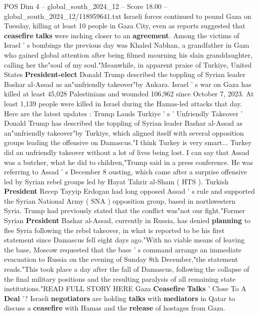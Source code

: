 \begin{textsample}{POS Dim 4 – global\_south\_2024\_12 – Score 18.00 – global\_south\_2024\_12/118959641.txt}  \label{ex:f4_pos_238}
Israeli forces continued to pound Gaza on Tuesday, killing at least 10 people in Gaza City, even as reports suggested that \textbf{ceasefire} \textbf{talks} were inching closer to an \textbf{agreement}.
Among the victims of Israel ' s bombings the previous day was Khaled Nabhan, a grandfather in Gaza who gained global attention after being filmed mourning his slain granddaughter, calling her the"soul of my soul."Meanwhile, in apparent praise of Turkiye, United States \textbf{President-elect} Donald Trump described the toppling of Syrian leader Bashar al-Assad as an"unfriendly takeover"by Ankara.
Israel ' s war on Gaza has killed at least 45,028 Palestinians and wounded 106,962 since October 7, 2023.
At least 1,139 people were killed in Israel during the Hamas-led attacks that day.
Here are the latest updates : Trump Lauds Turkiye ' s ' Unfriendly Takeover ' Donald Trump has described the toppling of Syrian leader Bashar al-Assad as an"unfriendly takeover"by Turkiye, which aligned itself with several opposition groups leading the offensive on Damascus."I think Turkey is very smart...
Turkey did an unfriendly takeover without a lot of lives being lost.
I can say that Assad was a butcher, what he did to children,"Trump said in a press conference.
He was referring to Assad ' s December 8 ousting, which came after a surprise offensive led by Syrian rebel groups led by Hayat Tahrir al-Sham ( HTS ).
Turkish \textbf{President} Recep Tayyip Erdogan had long opposed Assad ' s rule and supported the Syrian National Army ( SNA ) opposition group, based in northwestern Syria.
Trump had previously stated that the conflict was"not our fight."Former Syrian \textbf{President} Bashar al-Assad, currently in Russia, has denied \textbf{planning} to flee Syria following the rebel takeover, in what is reported to be his first statement since Damascus fell eight days ago."With no viable means of leaving the base, Moscow requested that the base ' s command arrange an immediate evacuation to Russia on the evening of Sunday 8th December,"the statement reads."This took place a day after the fall of Damascus, following the collapse of the final military positions and the resulting paralysis of all remaining state institutions."READ FULL STORY HERE Gaza \textbf{Ceasefire} \textbf{Talks} ' Close To A \textbf{Deal} '?
Israeli \textbf{negotiators} are holding \textbf{talks} with \textbf{mediators} in Qatar to discuss a \textbf{ceasefire} with Hamas and the \textbf{release} of hostages from Gaza.

\end{textsample}
